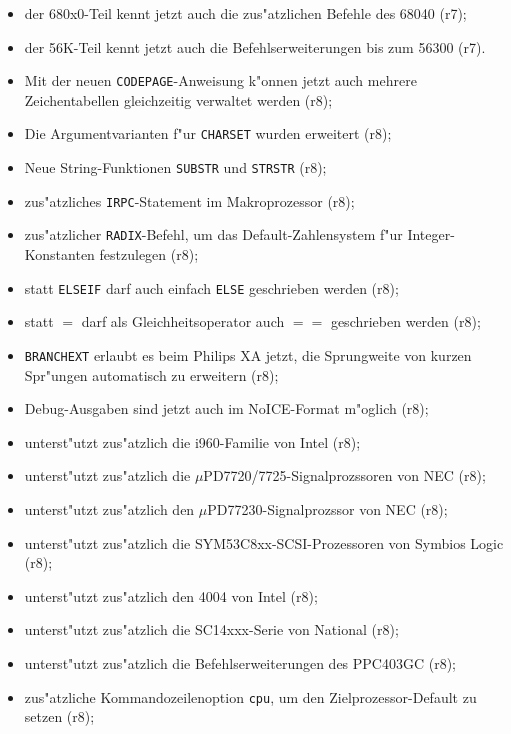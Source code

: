 \documentclass[12pt,a4paper,twoside]{report}
\newcommand{\tty}[1]{{\tt #1}}
\begin{document}
\begin{itemize}
{\begin{itemize}
{            (r7);}
      \item{der 680x0-Teil kennt jetzt auch die zus"atzlichen Befehle des
            68040 (r7);}
      \item{der 56K-Teil kennt jetzt auch die Befehlserweiterungen bis zum
            56300 (r7).}
      \item{Mit der neuen \tty{CODEPAGE}-Anweisung k"onnen jetzt auch
            mehrere Zeichentabellen gleichzeitig verwaltet werden (r8);}
      \item{Die Argumentvarianten f"ur \tty{CHARSET} wurden erweitert
            (r8);}
      \item{Neue String-Funktionen \tty{SUBSTR} und \tty{STRSTR} (r8);}
      \item{zus"atzliches \tty{IRPC}-Statement im Makroprozessor (r8);}
      \item{zus"atzlicher {\tt RADIX}-Befehl, um das Default-Zahlensystem
            f"ur Integer-Konstanten festzulegen (r8);}
      \item{statt {\tt ELSEIF} darf auch einfach {\tt ELSE} geschrieben
            werden (r8);}
      \item{statt $=$ darf als Gleichheitsoperator auch $==$ geschrieben
            werden (r8);}
      \item{\tty{BRANCHEXT} erlaubt es beim Philips XA jetzt, die
            Sprungweite von kurzen Spr"ungen automatisch zu erweitern
            (r8);}
      \item{Debug-Ausgaben sind jetzt auch im NoICE-Format m"oglich (r8);}
      \item{unterst"utzt zus"atzlich die i960-Familie von Intel (r8);}
      \item{unterst"utzt zus"atzlich die $\mu$PD7720/7725-Signalprozssoren
            von NEC (r8);}
      \item{unterst"utzt zus"atzlich den $\mu$PD77230-Signalprozssor von
            NEC (r8);}
      \item{unterst"utzt zus"atzlich die SYM53C8xx-SCSI-Prozessoren von
            Symbios Logic (r8);}
      \item{unterst"utzt zus"atzlich den 4004 von Intel (r8);}
      \item{unterst"utzt zus"atzlich die SC14xxx-Serie von National (r8);}
      \item{unterst"utzt zus"atzlich die Befehlserweiterungen des PPC403GC
            (r8);}
      \item{zus"atzliche Kommandozeilenoption {\tt cpu}, um den
            Zielprozessor-Default zu setzen (r8);}

\end{itemize}}
\end{itemize}
\end{document}
